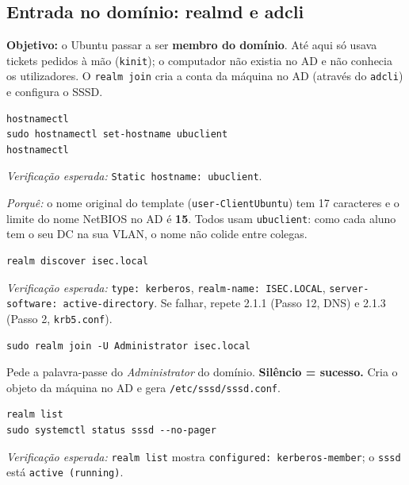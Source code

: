 
\subsection[Entrada no domínio: realmd e adcli]{Entrada no domínio: realmd e adcli}


\textbf{Objetivo:} o Ubuntu passar a ser \textbf{membro do domínio}. Até aqui só usava tickets pedidos à mão (\texttt{kinit}); o computador não existia no AD e não conhecia os utilizadores. O \texttt{realm join} cria a conta da máquina no AD (através do \texttt{adcli}) e configura o SSSD.


\begin{lstlisting}[style=bashstyle]
hostnamectl
sudo hostnamectl set-hostname ubuclient
hostnamectl
\end{lstlisting}

\emph{Verificação esperada:} \texttt{Static hostname: ubuclient}.

\emph{Porquê:} o nome original do template (\texttt{user-ClientUbuntu}) tem 17 caracteres e o limite do nome NetBIOS no AD é \textbf{15}. Todos usam \texttt{ubuclient}: como cada aluno tem o seu DC na sua VLAN, o nome não colide entre colegas.


\begin{lstlisting}[style=bashstyle]
realm discover isec.local
\end{lstlisting}

\emph{Verificação esperada:} \texttt{type: kerberos}, \texttt{realm-name: ISEC.LOCAL}, \texttt{server-software: active-directory}. Se falhar, repete 2.1.1 (Passo 12, DNS) e 2.1.3 (Passo 2, \texttt{krb5.conf}).


\begin{lstlisting}[style=bashstyle]
sudo realm join -U Administrator isec.local
\end{lstlisting}

Pede a palavra-passe do \emph{Administrator} do domínio. \textbf{Silêncio = sucesso.} Cria o objeto da máquina no AD e gera \texttt{/\allowbreak{}etc/\allowbreak{}sssd/\allowbreak{}sssd.conf}.


\begin{lstlisting}[style=bashstyle]
realm list
sudo systemctl status sssd --no-pager
\end{lstlisting}

\emph{Verificação esperada:} \texttt{realm list} mostra \texttt{configured: kerberos-member}; o \texttt{sssd} está \texttt{active (running)}.

